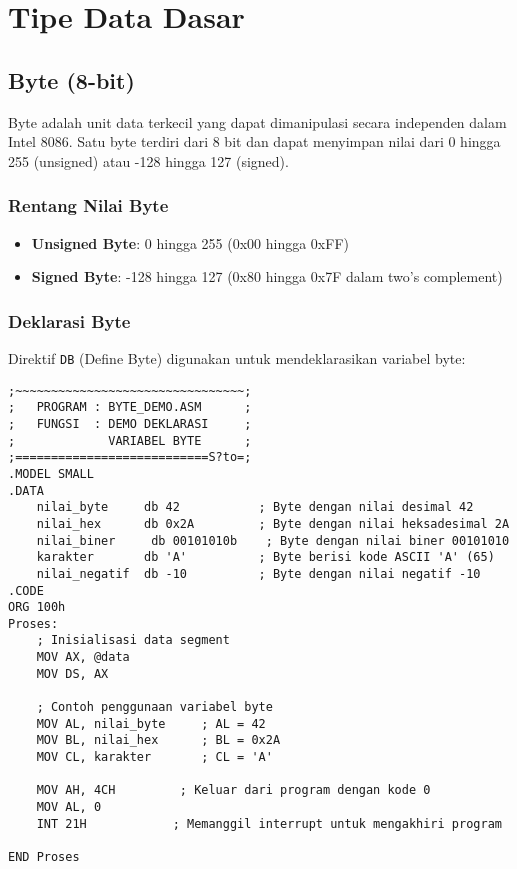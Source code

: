 \documentclass[../main.tex]{subfiles}
\begin{document}
\section{Tipe Data Dasar}

\subsection{Byte (8-bit)}
Byte adalah unit data terkecil yang dapat dimanipulasi secara independen dalam Intel 8086. Satu byte terdiri dari 8 bit dan dapat menyimpan nilai dari 0 hingga 255 (unsigned) atau -128 hingga 127 (signed).

\subsubsection{Rentang Nilai Byte}
\begin{itemize}
    \item \textbf{Unsigned Byte}: 0 hingga 255 (0x00 hingga 0xFF)
    \item \textbf{Signed Byte}: -128 hingga 127 (0x80 hingga 0x7F dalam two's complement)
\end{itemize}

\subsubsection{Deklarasi Byte}
Direktif \texttt{DB} (Define Byte) digunakan untuk mendeklarasikan variabel byte:

\begin{lstlisting}[language={[x86masm]Assembler}, caption=Deklarasi Variabel Byte, label={lst:byte-declaration}]
;~~~~~~~~~~~~~~~~~~~~~~~~~~~~~~~~;
;   PROGRAM : BYTE_DEMO.ASM      ;
;   FUNGSI  : DEMO DEKLARASI     ;
;             VARIABEL BYTE      ;
;===========================S?to=;
.MODEL SMALL
.DATA
    nilai_byte     db 42           ; Byte dengan nilai desimal 42
    nilai_hex      db 0x2A         ; Byte dengan nilai heksadesimal 2A
    nilai_biner     db 00101010b    ; Byte dengan nilai biner 00101010
    karakter       db 'A'          ; Byte berisi kode ASCII 'A' (65)
    nilai_negatif  db -10          ; Byte dengan nilai negatif -10
.CODE
ORG 100h
Proses:
    ; Inisialisasi data segment
    MOV AX, @data
    MOV DS, AX
    
    ; Contoh penggunaan variabel byte
    MOV AL, nilai_byte     ; AL = 42
    MOV BL, nilai_hex      ; BL = 0x2A
    MOV CL, karakter       ; CL = 'A'
    
    MOV AH, 4CH         ; Keluar dari program dengan kode 0
    MOV AL, 0
    INT 21H            ; Memanggil interrupt untuk mengakhiri program

END Proses
\end{lstlisting}
\end{document}
